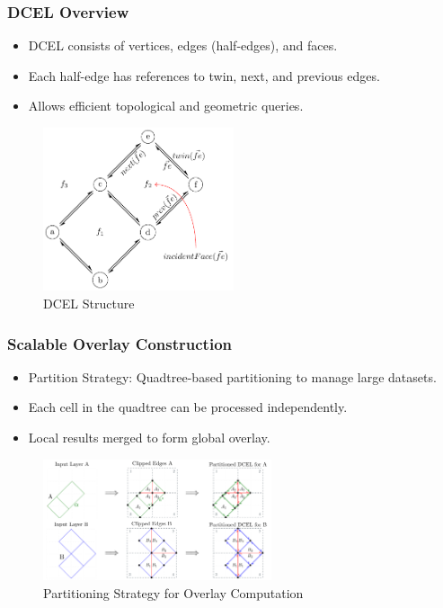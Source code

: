 \documentclass{beamer}
\begin{document}
\begin{frame}
    \frametitle{DCEL Overview}
    \begin{itemize}
        \item DCEL consists of vertices, edges (half-edges), and faces.
        \item Each half-edge has references to twin, next, and previous edges.
        \item Allows efficient topological and geometric queries.
    \end{itemize}
    \begin{figure}
        \includegraphics[width=0.5\textwidth]{chapterSDCEL/dcel_example/dcel_example} %
        \caption{DCEL Structure}
    \end{figure}
\end{frame}

\begin{frame}
    \frametitle{Scalable Overlay Construction}
    \begin{itemize}
        \item Partition Strategy: Quadtree-based partitioning to manage large datasets.
        \item Each cell in the quadtree can be processed independently.
        \item Local results merged to form global overlay.
    \end{itemize}
    \begin{figure}
        \includegraphics[width=0.6\textwidth]{chapterSDCEL/partition_schema/PolygonsParted} %
        \caption{Partitioning Strategy for Overlay Computation}
    \end{figure}
\end{frame}
\end{document}
